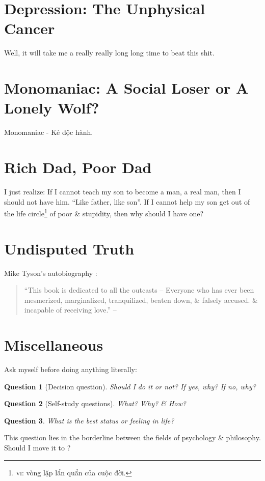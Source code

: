 \documentclass[oneside]{book}
\numberwithin{equation}{section}
\newtheorem{question}{Question}[chapter]
\begin{document}
\section{Depression: The Unphysical Cancer}
Well, it will take me a really really long long time to beat this shit.

\section{Monomaniac: A Social Loser or A Lonely Wolf?}
Monomaniac - Kẻ độc hành.

\section{Rich Dad, Poor Dad}
I just realize: If I cannot teach my son to become a man, a real man, then I should not have him. ``Like father, like son''. If I cannot help my son get out of the life circle\footnote{\textsc{vi}: vòng lặp lẩn quẩn của cuộc đời.} of poor \& stupidity, then why should I have one?

\section{Undisputed Truth}
Mike Tyson's  autobiography \cite{Tyson_Sloman2013}:
\begin{quotation}
	``This book is dedicated to all the outcasts -- Everyone who has ever been mesmerized, marginalized, tranquilized, beaten down, \& falsely accused. \& incapable of receiving love.'' -- \cite[Dedication]{Tyson_Sloman2013}
\end{quotation}


\section{Miscellaneous}
Ask myself before doing anything literally:

\begin{question}[Decision question]
	Should I do it or not? If yes, why? If no, why?
\end{question}

\begin{question}[Self-study questions]
	What? Why? \& How?
\end{question}

\begin{question}
	What is the best status or feeling in life?
\end{question}
This question lies in the borderline between the fields of psychology \& philosophy. Should I move it to \cite{NQBH/philosophy}?
\end{document}
